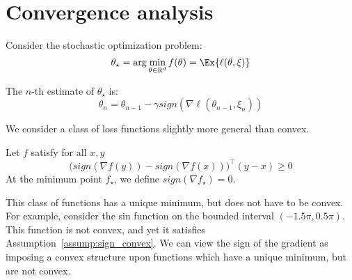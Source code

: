 \documentclass[12pt]{article}
\begin{document}
\section{Convergence analysis}


Consider the stochastic optimization problem:
\begin{equation}
\theta_\star = \arg \min_{\theta \in \mathbb{R}^d} f ( \theta ) = \Ex{ \ell ( \theta, \xi ) }
\end{equation}

The $n$-th estimate of $\theta_\star$ is:
\begin{equation}
\label{eq:signSGD}
\theta_n = \theta_{n-1} - \gamma sign ( \nabla \ell ( \theta_{n-1}, \xi_n ) )
\end{equation}


We consider a class of loss functions slightly more general than convex.

\begin{assumption}
\label{assump:sign_convex}
Let $f$ satisfy for all $x, y$
\begin{equation*}
\biggl( sign ( \nabla f (y) ) - sign ( \nabla f(x) ) \biggr)^\top ( y - x ) \geq 0
\end{equation*}
At the minimum point $f_\star$, we define $sign ( \nabla f_\star ) = 0$.
\end{assumption}

This class of functions has a unique minimum, but does not have to be convex.
For example, consider the sin function on the bounded interval $(-1.5 \pi, 0.5 \pi)$.
This function is not convex, and yet it satisfies Assumption~\ref{assump:sign_convex}.
We can view the sign of the gradient as imposing a convex structure upon functions which have a unique minimum, but are not convex.
\end{document}
